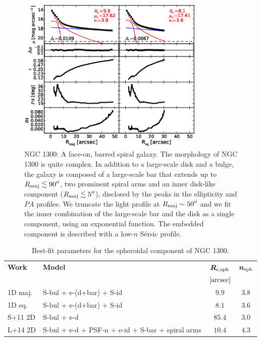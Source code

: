 \documentclass[preprint2]{emulateapj}
\newcommand{\fitfigurewidth}{0.8\textwidth}
\begin{document}
  \begin{figure}[h]
  \begin{center}
  \includegraphics[width=\fitfigurewidth]{n1300_1Dfit.eps}
  \caption{NGC 1300: 
  A face-on, barred spiral galaxy. 
  The morphology of NGC 1300 is quite complex. 
  In addition to a large-scale disk and a bulge, the galaxy is composed of 
  a large-scale bar that extends up to $R_{\rm maj} \lesssim 90''$, two prominent spiral arms 
  and an inner disk-like component ($R_{\rm maj} \lesssim 5''$), disclosed by the peaks in the ellipticity and $PA$ profiles.
  We truncate the light profile at $R_{\rm maj} \sim 50''$ and we fit the inner combination of the large-scale bar and the disk 
  as a single component, using an exponential function. 
  The embedded component is described with a low-$n$ S\'ersic profile. 
  }
  \end{center}
  \end{figure}

  \begin{table}[h]
  \small
  \caption{Best-fit parameters for the spheroidal component of NGC 1300.}
  \begin{center}
  \begin{tabular}{llcc}
  \hline
  {\bf Work} & {\bf Model}   & $\bm R_{\rm e,sph}$    & $\bm n_{\rm sph}$ \\
    &  &  $[\rm arcsec]$ & \\
  \hline
  1D maj. & S-bul + e-(d+bar) + S-id & $9.9$  &  $3.8$ \\
  1D eq.  & S-bul + e-(d+bar) + S-id & $8.1$  &  $3.6$ \\
  \hline
  S+11 2D    & S-bul + e-d & $85.4$  &  $3.0$ \\
  L+14 2D    & S-bul + e-d + PSF-n + e-id + S-bar + spiral arms & $10.4$  &  $4.3$ \\
  \hline
  \end{tabular}
  \end{center}
  \label{tab:n1300}
  \end{table}
\end{document}

